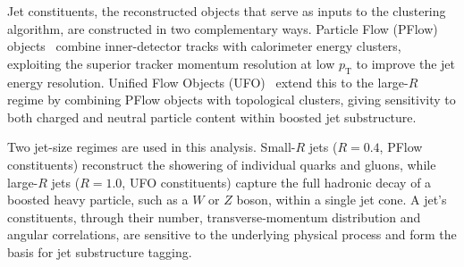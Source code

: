 Jet constituents, the reconstructed objects that serve as inputs to the clustering algorithm, are constructed in two complementary ways. Particle Flow (PFlow) objects~\cite{ATLAS:PFlow:2017} combine inner-detector tracks with calorimeter energy clusters, exploiting the superior tracker momentum resolution at low $p_\mathrm{T}$ to improve the jet energy resolution. Unified Flow Objects (UFO)~\cite{ATLAS:UFO:2021} extend this to the large-$R$ regime by combining PFlow objects with topological clusters, giving sensitivity to both charged and neutral particle content within boosted jet substructure.

Two jet-size regimes are used in this analysis. Small-$R$ jets ($R = 0.4$, PFlow constituents) reconstruct the showering of individual quarks and gluons, while large-$R$ jets ($R = 1.0$, UFO constituents) capture the full hadronic decay of a boosted heavy particle, such as a $W$ or $Z$ boson, within a single jet cone. A jet's constituents, through their number, transverse-momentum distribution and angular correlations, are sensitive to the underlying physical process and form the basis for jet substructure tagging.
